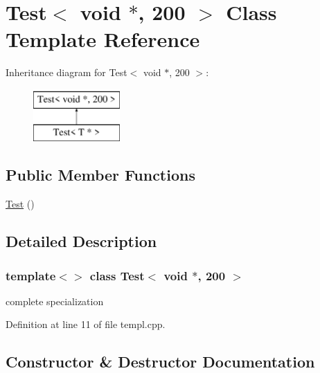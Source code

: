 \hypertarget{class_test_3_01void_01_5_00_01200_01_4}{}\section{Test$<$ void $\ast$, 200 $>$ Class Template Reference}
\label{class_test_3_01void_01_5_00_01200_01_4}
Inheritance diagram for Test$<$ void $\ast$, 200 $>$\+:\begin{figure}[H]
\begin{center}
\leavevmode
\includegraphics[height=2.000000cm]{class_test_3_01void_01_5_00_01200_01_4}
\end{center}
\end{figure}
\subsection*{Public Member Functions}
\begin{DoxyCompactItemize}
\item 
\mbox{\hyperlink{class_test_3_01void_01_5_00_01200_01_4_aef160085cc11406b872b45fa871c7692}{Test}} ()
\end{DoxyCompactItemize}


\subsection{Detailed Description}
\subsubsection*{template$<$$>$\newline
class Test$<$ void $\ast$, 200 $>$}

complete specialization 

Definition at line 11 of file templ.\+cpp.



\subsection{Constructor \& Destructor Documentation}
\mbox{\label{class_test_3_01void_01_5_00_01200_01_4_aef160085cc11406b872b45fa871c7692}} 

